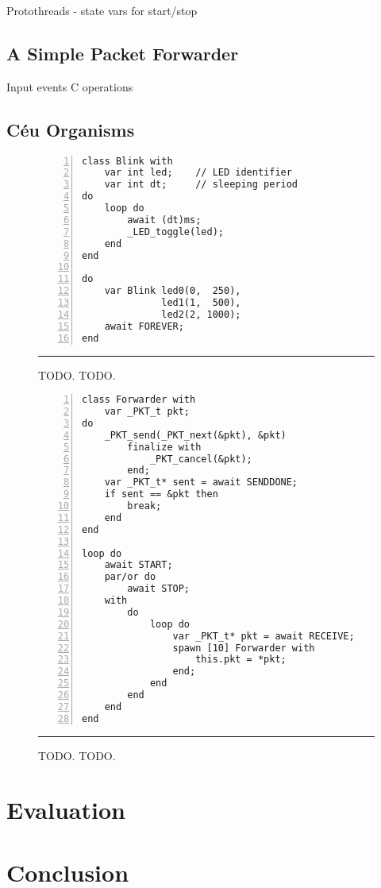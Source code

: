 \documentclass{sig-alternate-ipsn13}
\begin{document}
Protothreads
- state vars for start/stop

\subsection{A Simple Packet Forwarder}

Input events
C operations

\subsection{C\'eu Organisms}

\begin{figure}[h]
\begin{lstlisting}[numbers=left,xleftmargin=3em]
class Blink with
    var int led;    // LED identifier
    var int dt;     // sleeping period
do
    loop do
        await (dt)ms;
        _LED_toggle(led);
    end
end

do
    var Blink led0(0,  250),
              led1(1,  500),
              led2(2, 1000);
    await FOREVER;
end
\end{lstlisting}
\rule{8.6cm}{0.37pt}
\caption{ TODO.\newline
{\small %
TODO.
}%
\label{lst.TODO}
}
\end{figure}

\begin{figure}[h]
\begin{lstlisting}[numbers=left,xleftmargin=3em]
class Forwarder with
    var _PKT_t pkt;
do
    _PKT_send(_PKT_next(&pkt), &pkt)
        finalize with
            _PKT_cancel(&pkt);
        end;
    var _PKT_t* sent = await SENDDONE;
    if sent == &pkt then
        break;
    end
end

loop do
    await START;
    par/or do
        await STOP;
    with
        do
            loop do
                var _PKT_t* pkt = await RECEIVE;
                spawn [10] Forwarder with
                    this.pkt = *pkt;
                end;
            end
        end
    end
end
\end{lstlisting}
\rule{8.6cm}{0.37pt}
\caption{ TODO.\newline
{\small %
TODO.
}%
\label{lst.TODO}
}
\end{figure}

\section{Evaluation}

\section{Conclusion}



\end{document}
